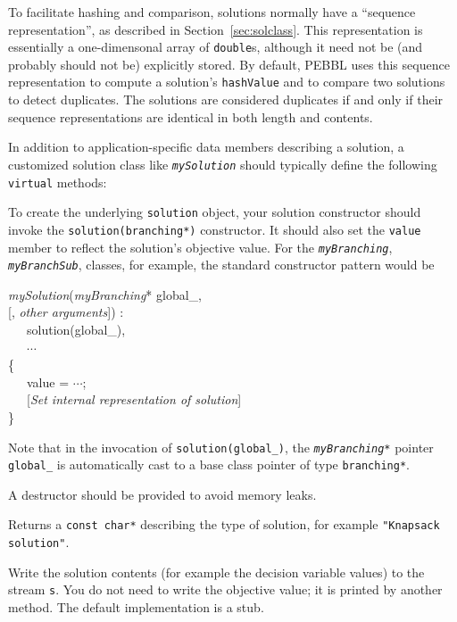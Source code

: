 To facilitate hashing and comparison, solutions normally
have a ``sequence representation'', as described in
Section~\ref{sec:solclass}.  This representation is essentially a
one-dimensonal array of \texttt{double}s, although it need not be (and
probably should not be) explicitly stored.  By default, PEBBL uses
this sequence representation to compute a solution's
\texttt{hashValue} and to compare two solutions to detect duplicates.
The solutions are considered duplicates if and only if their sequence
representations are identical in both length and contents.

In addition to application-specific data members describing a
solution, a customized solution class like \texttt{\emph{mySolution}}
should typically define the following \texttt{virtual} methods:

\vspace{2ex}

To create the underlying \texttt{solution} object, your solution constructor
should invoke the \texttt{solution(branching*)} constructor.  It should also
set the \texttt{value} member to reflect the solution's objective
value.  For the \texttt{\emph{myBranching}},
\texttt{\emph{myBranchSub}}, classes, for example, the standard
constructor pattern would be
\begin{codeblock}
\emph{mySolution}(\=\emph{myBranching}* global\_, \\
                  \>\textrm{[}, \textrm{\emph{other arguments}]}) : \\
~~~solution(global\_), \\
~~~$\cdots$ \\
\{ \\
~~~value = $\cdots$; \\
~~~\textrm{[\emph{Set internal representation of solution}]} \\
\}
\end{codeblock}
Note that in the invocation of \texttt{solution(global\_)}, the
\texttt{\emph{myBranching*}} pointer \texttt{global\_} is
automatically cast to a base class pointer of type
\texttt{branching*}. 

A destructor should be provided to avoid memory leaks.

 Returns a \texttt{const
  char*} describing the type of solution, for example
\texttt{"Knapsack solution"}.

 Write the
solution contents (for example the decision variable values) to the stream
\texttt{s}.  You do not need to write the objective value; it is
printed by another method.  The default implementation is a stub.

